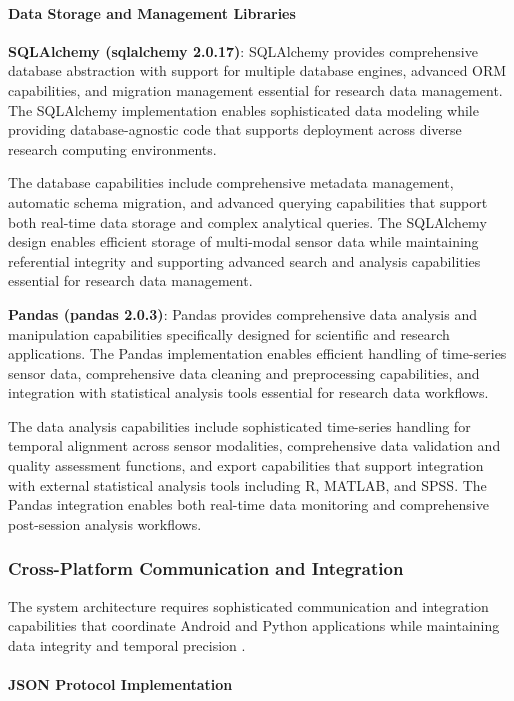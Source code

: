 \documentclass[12pt,a4paper]{report}
\begin{document}
\paragraph{Data Storage and Management Libraries}

\textbf{SQLAlchemy (sqlalchemy 2.0.17)}: SQLAlchemy provides comprehensive database abstraction with support for multiple
database engines, advanced ORM capabilities, and migration management essential for research data management. The
SQLAlchemy implementation enables sophisticated data modeling while providing database-agnostic code that supports
deployment across diverse research computing environments.

The database capabilities include comprehensive metadata management, automatic schema migration, and advanced querying
capabilities that support both real-time data storage and complex analytical queries. The SQLAlchemy design enables
efficient storage of multi-modal sensor data while maintaining referential integrity and supporting advanced search and
analysis capabilities essential for research data management.

\textbf{Pandas (pandas 2.0.3)}: Pandas provides comprehensive data analysis and manipulation capabilities specifically
designed for scientific and research applications. The Pandas implementation enables efficient handling of time-series
sensor data, comprehensive data cleaning and preprocessing capabilities, and integration with statistical analysis tools
essential for research data workflows.

The data analysis capabilities include sophisticated time-series handling for temporal alignment across sensor
modalities, comprehensive data validation and quality assessment functions, and export capabilities that support
integration with external statistical analysis tools including R, MATLAB, and SPSS. The Pandas integration enables both
real-time data monitoring and comprehensive post-session analysis workflows.

\subsubsection{Cross-Platform Communication and Integration}

The system architecture requires sophisticated communication and integration capabilities that coordinate Android and
Python applications while maintaining data integrity and temporal precision .

\paragraph{JSON Protocol Implementation}
\end{document}
